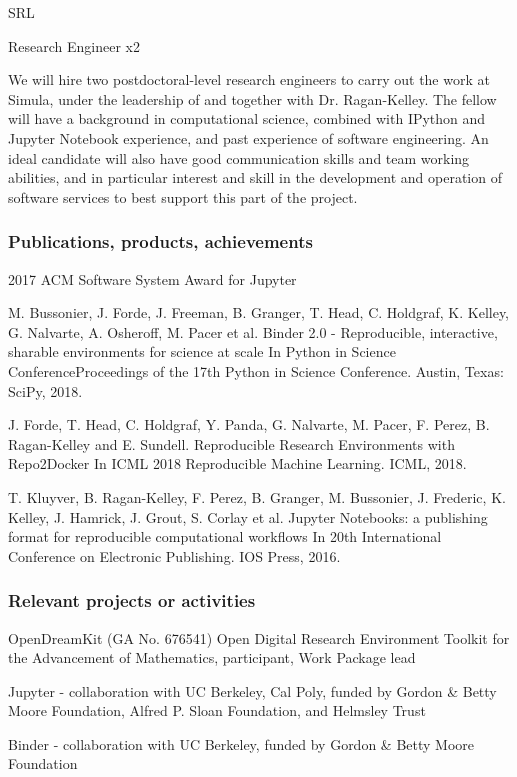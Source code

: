 \begin{sitedescription}{SRL}
\begin{participant}[PM=72, type=R]{Research Engineer x2}

We will hire two postdoctoral-level research engineers to carry out the work
at Simula, under the leadership of and together with Dr. Ragan-Kelley.  The
fellow will have a background in computational science, combined with IPython
and Jupyter Notebook experience, and past experience of software engineering.
An ideal candidate will also have good communication skills and team working
abilities, and in particular interest and skill in the development and
operation of software services to best support this part of the project.

\end{participant}


\subsubsection*{Publications, products, achievements}

\begin{compactenum}
\item 2017 ACM Software System Award for Jupyter
\item M. Bussonier, J. Forde, J. Freeman, B. Granger, T. Head, C. Holdgraf, K.
  Kelley, G. Nalvarte, A. Osheroff, M. Pacer et al. Binder 2.0 - Reproducible,
  interactive, sharable environments for science at scale In Python in Science
  ConferenceProceedings of the 17th Python in Science Conference. Austin,
  Texas: SciPy, 2018.
\item J. Forde, T. Head, C. Holdgraf, Y. Panda, G. Nalvarte, M. Pacer, F.
  Perez, B. Ragan-Kelley and E. Sundell. Reproducible Research Environments
  with Repo2Docker In ICML 2018 Reproducible Machine Learning. ICML, 2018.
\item T. Kluyver, B. Ragan-Kelley, F. Perez, B. Granger, M. Bussonier, J.
  Frederic, K. Kelley, J. Hamrick, J. Grout, S. Corlay et al. Jupyter
  Notebooks: a publishing format for reproducible computational workflows In
  20th International Conference on Electronic Publishing. IOS Press, 2016.

\end{compactenum}

\subsubsection*{Relevant projects or activities}

\begin{compactenum}
\item OpenDreamKit (GA No. 676541) Open Digital Research Environment Toolkit for the Advancement of Mathematics, participant, Work Package lead
\item Jupyter - collaboration with UC Berkeley, Cal Poly, funded by Gordon \&
  Betty Moore Foundation, Alfred P. Sloan Foundation, and Helmsley Trust
\item Binder - collaboration with UC Berkeley, funded by Gordon \& Betty Moore
  Foundation
\end{compactenum}


\end{sitedescription}
